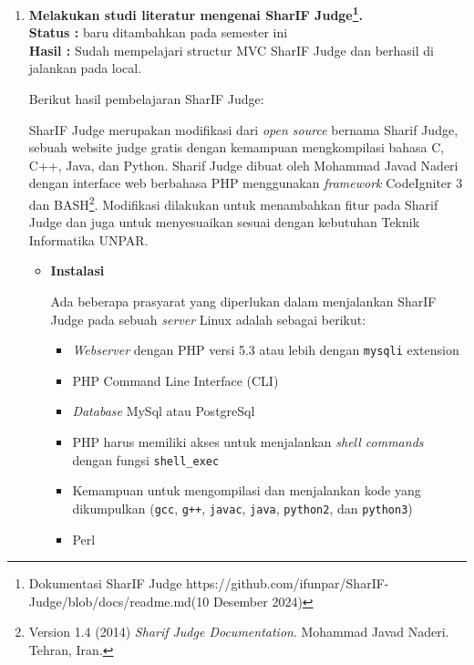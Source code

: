 \documentclass[a4paper,twoside]{article}
\begin{document}
\begin{enumerate}
	\item \textbf{Melakukan studi literatur mengenai SharIF Judge\footnote{Dokumentasi SharIF Judge https://github.com/ifunpar/SharIF-Judge/blob/docs/readme.md(10 Desember 2024)}.}\\
	      {\bf Status :} baru ditambahkan pada semester ini\\
	      {\bf Hasil :} Sudah mempelajari structur MVC SharIF Judge dan berhasil di jalankan pada local.

	      Berikut hasil pembelajaran SharIF Judge:

	      SharIF Judge merupakan modifikasi dari \textit{open source} bernama Sharif Judge, sebuah website judge gratis dengan kemampuan mengkompilasi bahasa C, C++, Java, dan Python. Sharif Judge dibuat oleh Mohammad Javad Naderi dengan interface web berbahasa PHP menggunakan \textit{framework} CodeIgniter 3 dan BASH\footnote{Version 1.4 (2014) {\em Sharif Judge Documentation}. Mohammad Javad Naderi. Tehran, Iran.}. Modifikasi dilakukan untuk menambahkan fitur pada Sharif Judge dan juga untuk menyesuaikan sesuai dengan kebutuhan Teknik Informatika UNPAR.

	      \begin{itemize}
		      \item \textbf{Instalasi}
		            \label{sub:2:1:instalasi}

		            Ada beberapa prasyarat yang diperlukan dalam menjalankan SharIF Judge pada sebuah \textit{server} Linux adalah sebagai berikut:

		            \vspace{0.25cm}
		            \begin{itemize}
			            \item \textit{Webserver} dengan PHP versi 5.3 atau lebih dengan \texttt{mysqli} extension
			            \item PHP Command Line Interface (CLI)
			            \item \textit{Database} MySql atau PostgreSql
			            \item PHP harus memiliki akses untuk menjalankan \textit{shell commands} dengan fungsi \verb|shell_exec|
			            \item Kemampuan untuk mengompilasi dan menjalankan kode yang dikumpulkan (\texttt{gcc}, \texttt{g++}, \texttt{javac}, \texttt{java}, \texttt{python2}, dan \texttt{python3})
			            \item Perl
		            \end{itemize}
		            \vspace{0.25cm}


\end{itemize}
\end{enumerate}
\end{document}
